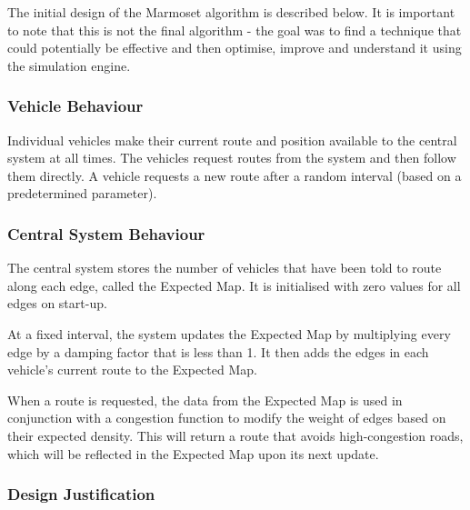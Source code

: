 \documentclass[ %
                    author={Alexander Hill},
                supervisor={Dr. Benjamin Sach},
                    degree={MEng},
                     title={MARMOSET},
                  subtitle={Multi-Agent Route Management using Online Simulation for Efficient Transportation},
                      type={research},
                      year={2016} ]{dissertation}
\begin{document}
The initial design of the Marmoset algorithm is described below. It is
important to note that this is not the final algorithm - the goal was to find a
technique that could potentially be effective and then optimise, improve and
understand it using the simulation engine.

\subsubsection{Vehicle Behaviour}

Individual vehicles make their current route and position available to
the central system at all times. The vehicles request routes from the system and
then follow them directly. A vehicle requests a new route after a random
interval (based on a predetermined parameter).

\subsubsection{Central System Behaviour}

The central system stores the number of vehicles that have been told to route
along each edge, called the Expected Map. It is initialised with zero values for
all edges on start-up.

At a fixed interval, the system updates the Expected Map by multiplying every
edge by a damping factor that is less than 1. It then adds the edges in each
vehicle's current route to the Expected Map.

When a route is requested, the data from the Expected Map is used in conjunction
with a congestion function to modify the weight of edges based on their expected
density. This will return a route that avoids high-congestion roads, which will
be reflected in the Expected Map upon its next update.

\subsubsection{Design Justification}
\end{document}
